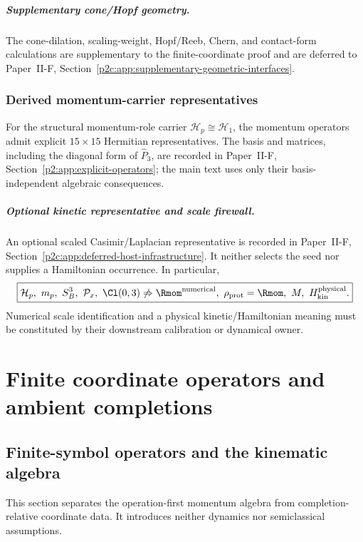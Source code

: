 \documentclass[12pt,a4paper]{article}
\begin{document}
\subparagraph{Supplementary cone/Hopf geometry.}
The cone-dilation, scaling-weight, Hopf/Reeb, Chern, and contact-form
calculations are supplementary to the finite-coordinate proof and are
deferred to Paper~II-F, Section~\ref{p2c:app:supplementary-geometric-interfaces}.

\subsubsection{Derived momentum-carrier representatives}
For the structural momentum-role carrier \(\mathcal H_p\cong\mathcal H_1\), the
momentum operators admit explicit \(15\times15\) Hermitian representatives.
The basis and matrices, including the diagonal form of \(\widehat P_3\), are
recorded in Paper~II-F, Section~\ref{p2:app:explicit-operators}; the main text uses only
their basis-independent algebraic consequences.

\subparagraph{Optional kinetic representative and scale firewall.}
An optional scaled Casimir/Laplacian representative is recorded in
Paper~II-F, Section~\ref{p2c:app:deferred-host-infrastructure}.  It neither selects the
seed nor supplies a Hamiltonian occurrence.  In particular,
\[
 \boxed{
 \mathcal H_p,\ m_p,\ S^3_B,\ \mathcal P_x,\ \Cl(0,3)
 \not\Rightarrow
 \Rmom^{\rm numerical},\
 \rho_{\rm prot}=\Rmom,\
 M,\
 H_{\rm kin}^{\rm physical}.}
\]
Numerical scale identification and a physical kinetic/Hamiltonian meaning
must be constituted by their downstream calibration or dynamical owner.


\section{Finite coordinate operators and ambient completions}
\label{paper2c:sec:organized-operators}

\subsection{Finite-symbol operators and the kinematic algebra}
\label{p2:sec:derived-algebra}
This section separates the operation-first momentum algebra from
completion-relative coordinate data.  It introduces neither dynamics nor
semiclassical assumptions.
\end{document}
